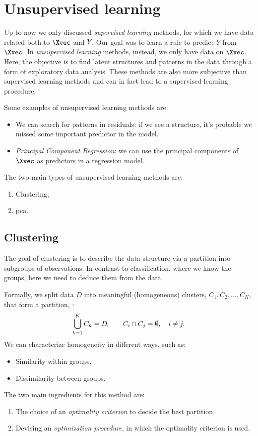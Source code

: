 \chapter{Unsupervised learning}

Up to now we only discussed \emph{supervised learning} methods, for which we have data related both to $\Xvec$ and $Y\negthinspace$. Our goal was to learn a rule to predict $Y$ from $\Xvec$. In \emph{unsupervised learning} methods, instead, we only have data on $\Xvec$. Here, the objective is to find latent structures and patterns in the data through a form of exploratory data analysis. These methods are also more subjective than supervised learning methods and can in fact lead to a supervised learning procedure.

Some examples of unsupervised learning methods are:
\begin{itemize}
    \item We can search for patterns in residuals: if we see a structure, it's probable we missed some important predictor in the model.
    \item \emph{Principal Component Regression}: we can use the principal components of $\Xvec$ as predictors in a regression model.
\end{itemize}

The two main types of unsupervised learning methods are:
\begin{enumerate}
    \item Clustering,
    \item \acf{pca}.
\end{enumerate}

\section{Clustering}

The goal of clustering is to describe the data structure via a partition into subgroups of observations. In contrast to classification, where we know the groups, here we need to deduce them from the data.

Formally, we split data $D$ into meaningful (homogeneous) clusters, $C_1, C_2, \dots, C_K$, that form a partition, \ie:
\begin{equation}
    \bigcup_{k=1}^K C_k = D\negthinspace, \qquad C_i \cap C_j = \emptyset, \quad i \neq j.
\end{equation}
We can characterize homogeneity in different ways, such as:
\begin{itemize}
    \item Similarity within groups,
    \item Dissimilarity between groups.
\end{itemize}
The two main ingredients for this method are:
\begin{enumerate}
    \item The choice of an \emph{optimality criterion} to decide the best partition.
    \item Devising an \emph{optimization procedure}, in which the optimality criterion is used.
\end{enumerate}

